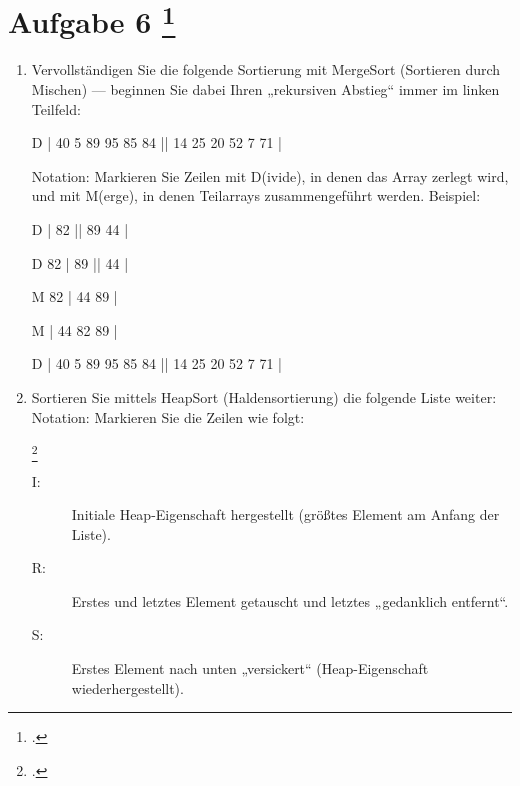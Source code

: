 \documentclass{lehramt-informatik-aufgabe}
\begin{document}

\section{Aufgabe 6
\footcite[Thema 2 Aufgabe 6]{examen:46115:2013:03}}

\begin{enumerate}


\item Vervollständigen Sie die folgende Sortierung mit MergeSort
(Sortieren durch Mischen) — beginnen Sie dabei Ihren
„rekursiven Abstieg“ immer im linken Teilfeld:

D | 40 5 89 95 85 84 || 14 25 20 52 7 71 |

Notation: Markieren Sie Zeilen mit D(ivide), in denen das Array zerlegt
wird, und mit M(erge), in denen Teilarrays zusammengeführt werden.
Beispiel:

D | 82 || 89 44 |

D 82 | 89 || 44 |

M 82 | 44 89 |

M | 44 82 89 |

\begin{liAntwort}
D | 40 5 89 95 85 84 || 14 25 20 52 7 71 |
\end{liAntwort}


\item Sortieren Sie mittels HeapSort (Haldensortierung) die folgende
Liste weiter: Notation: Markieren Sie die Zeilen wie
folgt:

\footcite[Aufgabe 4: Sortieren II entnommen aus Algorithmen und
Datenstrukturen, Übungsblatt 4, Universität Würzburg]{aud:pu:7}

\begin{description}
\item[I:] Initiale Heap-Eigenschaft hergestellt (größtes Element am
Anfang der Liste).

\item[R:] Erstes und letztes Element getauscht und letztes „gedanklich
entfernt“.

\item[S:] Erstes Element nach unten „versickert“ (Heap-Eigenschaft
wiederhergestellt).
\end{description}

\end{enumerate}
\end{document}
